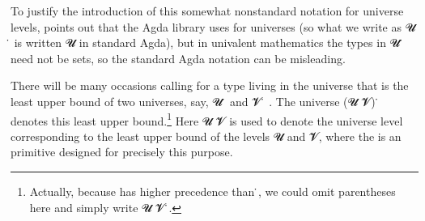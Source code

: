 
To justify the introduction of this somewhat nonstandard notation for universe levels, \mhe points out that the Agda library uses  for universes (so what we write as \ab 𝓤 ̇ is written \Set{}\ab 𝓤 in standard Agda), but in univalent mathematics the types in \ab 𝓤 ̇ need not be sets, so the standard Agda notation can be misleading.

There will be many occasions calling for a type living in the universe that is the least upper bound of two universes, say, \ab 𝓤 ̇ and \ab 𝓥 ̇ . The universe (\ab 𝓤  \ab 𝓥) ̇ denotes this least upper bound.\footnote{Actually, because \AgdaUnderscore{}\AgdaUnderscore{} has higher precedence than \AgdaUnderscore{}̇, we could omit parentheses here and simply write \ab 𝓤  \ab 𝓥 ̇.} Here \ab 𝓤  \ab 𝓥 is used to denote the universe level corresponding to the least upper bound of the levels \ab 𝓤 and \ab 𝓥, where the \AgdaUnderscore{}\AgdaUnderscore{} is an \agda primitive designed for precisely this purpose.




















